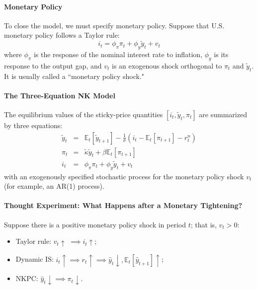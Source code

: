 \documentclass[12pt]{article}
\newcommand{\E}{\mathbb{E}}
\begin{document}
\paragraph{Monetary Policy \\ [6pt]}
To close the model, we must specify monetary policy. Suppose that U.S. monetary policy follows a Taylor rule:
\begin{equation}
	i_t = \phi_\pi \pi_t + \phi_y \tilde{y}_t + v_t
\end{equation}
where $\phi_\pi$ is the response of the nominal interest rate to inflation, $\phi_y$ is its response to the output gap, and $v_t$ is an exogenous shock orthogonal to $\pi_t$ and $\tilde{y}_t$. It is usually called a ``monetary policy shock."

\paragraph{The Three-Equation NK Model} The equilibrium values of the sticky-price quantities $[i_t, \tilde{y}_t, \pi_t]$ are summarized by three equations:
\begin{eqnarray}
	\tilde{y}_t &=& \E_t [\tilde{y}_{t+1}] - \frac{1}{\sigma} (i_t - \E_t[\pi_{t+1}]-r_t^n) \\
	\pi_t &=& \tilde{\kappa} \tilde{y}_t + \beta \E_t [\pi_{t+1}] \\
	i_t &=& \phi_\pi \pi_t + \phi_y \tilde{y}_t + v_t
\end{eqnarray}
with an exogenously specified stochastic process for the monetary policy shock $v_t$ (for example, an AR(1) process).

\paragraph{Thought Experiment: What Happens after a Monetary Tightening?} Suppose there is a positive monetary policy shock in period $t$; that is, $v_t > 0$:
\begin{itemize}
\item Taylor rule: $v_t \uparrow$ $\implies i_t \uparrow$;
\item Dynamic IS: $i_t \uparrow \implies r_t \uparrow \implies \hat{y}_t \downarrow, \E_t[\hat{y}_{t+1}] \uparrow$;
\item NKPC: $\hat{y}_t \downarrow \implies \pi_t \downarrow$.
\end{itemize}
\end{document}
